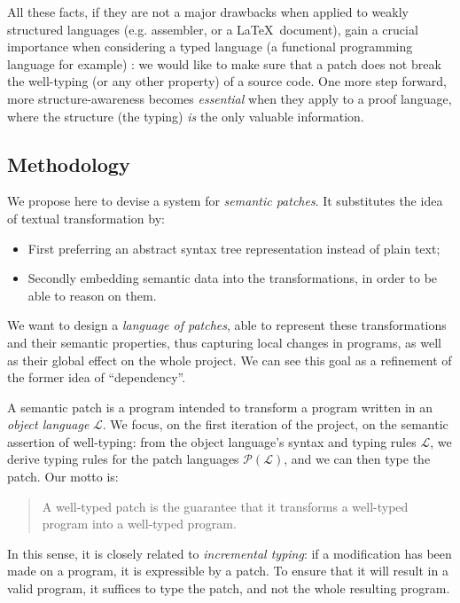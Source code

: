 \documentclass[twoside,a4paper,12pt]{article}
\begin{document}
All these facts, if they are not a major drawbacks when applied to
weakly structured languages (e.g. assembler, or a \LaTeX\ document),
gain a crucial importance when considering a typed language (a
functional programming language for example) : we would like to make
sure that a patch does not break the well-typing (or any other
property) of a source code.  One more step forward, more
structure-awareness becomes \emph{essential} when they apply to a
proof language, where the structure (the typing) \emph{is} the only
valuable information.

\subsection{Methodology}

We propose here to devise a system for \emph{semantic patches}. It
substitutes the idea of textual transformation by:
\begin{itemize}
\item First preferring an abstract syntax tree representation instead
  of plain text;
\item Secondly embedding semantic data into the transformations, in
  order to be able to reason on them.
\end{itemize}

We want to design a \emph{language of patches}, able to represent
these transformations and their semantic properties, thus capturing
local changes in programs, as well as their global effect on the whole
project. We can see this goal as a refinement of the former idea of
``dependency''.

A semantic patch is a program intended to transform a program written
in an \emph{object language} $\mathcal L$. We focus, on the first
iteration of the project, on the semantic assertion of well-typing:
from the object language's syntax and typing rules $\mathcal L$, we
derive typing rules for the patch languages $\mathcal P(\mathcal L)$,
and we can then type the patch. Our motto is:

\begin{quote} \label{motto}
  A well-typed patch is the guarantee that it transforms a well-typed
  program into a well-typed program.
\end{quote}

In this sense, it is closely related to \emph{incremental typing}: if
a modification has been made on a program, it is expressible by a
patch. To ensure that it will result in a valid program, it suffices
to type the patch, and not the whole resulting program.
\end{document}
